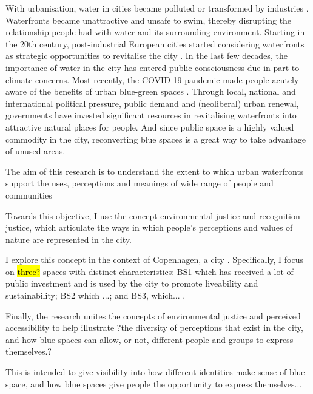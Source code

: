 \documentclass{article}
\begin{document}
With urbanisation, water in cities became polluted or transformed by industries \parencite{kampa_langaas_anzaldua_2016}. 
Waterfronts became unattractive and unsafe to swim, thereby disrupting the relationship people had with water and its surrounding environment.
Starting in the 20th century, post-industrial European cities started considering waterfronts as strategic opportunities to revitalise the city \parencite{del2021dismantling}. In the last few decades, the importance of water in the city has entered public consciousness due in part to climate concerns. Most recently, the COVID-19 pandemic made people acutely aware of the benefits of urban blue-green spaces \parencite{kohsaka2021urban}.
Through local, national and international political pressure, public demand and (neoliberal) urban renewal, governments have invested significant resources in revitalising waterfronts into attractive natural places for people. 
And since public space is a highly valued commodity in the city, reconverting blue spaces is a great way to take advantage of unused areas.


The aim of this research is to understand the extent to which urban waterfronts support the uses, perceptions and meanings of wide range of people and communities

Towards this objective, I use the concept environmental justice and recognition justice, which articulate the ways in which people's perceptions and values of nature are represented in the city.

I explore this concept in the context of Copenhagen, a city . Specifically, I focus on \hl{three?} spaces with distinct characteristics: BS1 which has received a lot of public investment and is used by the city to promote liveability and sustainability; BS2 which ...; and BS3, which... .

Finally, the research unites the concepts of environmental justice and perceived accessibility to help illustrate ?the diversity of perceptions that exist in the city, and how blue spaces can allow, or not, different people and groups to express themselves.?

This is intended to give visibility into how different identities make sense of blue space, and how blue spaces give people the opportunity to express themselves...

\end{document}
